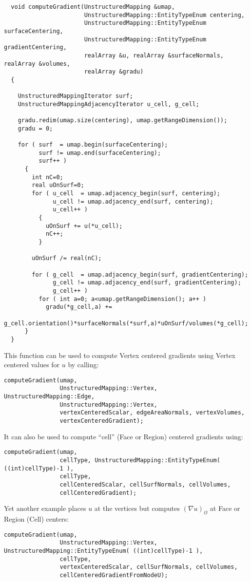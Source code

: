 \begin{verbatim}
  void computeGradient(UnstructuredMapping &umap, 
                       UnstructuredMapping::EntityTypeEnum centering, 
                       UnstructuredMapping::EntityTypeEnum surfaceCentering,
                       UnstructuredMapping::EntityTypeEnum gradientCentering,
                       realArray &u, realArray &surfaceNormals, realArray &volumes, 
                       realArray &gradu)
  {

    UnstructuredMappingIterator surf;
    UnstructuredMappingAdjacencyIterator u_cell, g_cell;

    gradu.redim(umap.size(centering), umap.getRangeDimension());
    gradu = 0;

    for ( surf  = umap.begin(surfaceCentering);
          surf != umap.end(surfaceCentering);
          surf++ )
      {
        int nC=0;
        real uOnSurf=0;
        for ( u_cell  = umap.adjacency_begin(surf, centering);
              u_cell != umap.adjacency_end(surf, centering);
              u_cell++ )
          {
            uOnSurf += u(*u_cell);
            nC++;
          }

        uOnSurf /= real(nC); 

        for ( g_cell  = umap.adjacency_begin(surf, gradientCentering);
              g_cell != umap.adjacency_end(surf, gradientCentering);
              g_cell++ )
          for ( int a=0; a<umap.getRangeDimension(); a++ )
            gradu(*g_cell,a) += 
                g_cell.orientation()*surfaceNormals(*surf,a)*uOnSurf/volumes(*g_cell);
      }
  }
\end{verbatim}

This function can be used to compute Vertex centered gradients using Vertex centered
values for $u$ by calling:
\begin{verbatim}
computeGradient(umap, 
                UnstructuredMapping::Vertex, UnstructuredMapping::Edge,
                UnstructuredMapping::Vertex,
                vertexCenteredScalar, edgeAreaNormals, vertexVolumes, 
                vertexCenteredGradient);
\end{verbatim}
It can also be used to compute ``cell'' (Face or Region) centered gradients using:
\begin{verbatim}
computeGradient(umap, 
                cellType, UnstructuredMapping::EntityTypeEnum( ((int)cellType)-1 ),
                cellType,
                cellCenteredScalar, cellSurfNormals, cellVolumes, 
                cellCenteredGradient);
\end{verbatim}
Yet another example places $u$ at the vertices but computes $(\nabla u)_\Omega$ at
Face or Region (Cell) centers:
\begin{verbatim}
computeGradient(umap,
                UnstructuredMapping::Vertex, UnstructuredMapping::EntityTypeEnum( ((int)cellType)-1 ),
                cellType,
                vertexCenteredScalar, cellSurfNormals, cellVolumes,
                cellCenteredGradientFromNodeU);
\end{verbatim}
